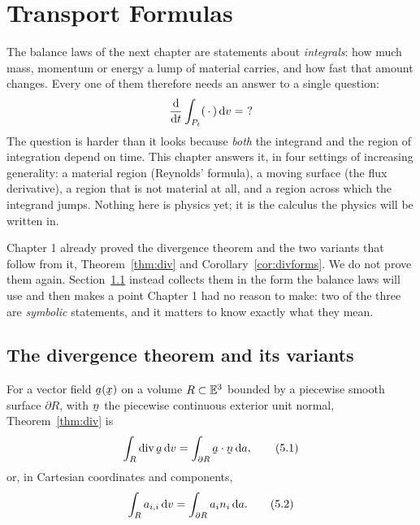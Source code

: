\chapter{Transport Formulas}

The balance laws of the next chapter are statements about \emph{integrals}:
how much mass, momentum or energy a lump of material carries, and how fast
that amount changes. Every one of them therefore needs an answer to a
single question:
\[
   \frac{\dl}{\dl t}\int_{P_{t}}(\,\cdot\,)\,\dl v=\ ?
\]
The question is harder than it looks because \emph{both} the integrand and
the region of integration depend on time. This chapter answers it, in four
settings of increasing generality: a material region (Reynolds' formula),
a moving surface (the flux derivative), a region that is not material at
all, and a region across which the integrand jumps. Nothing here is
physics yet; it is the calculus the physics will be written in.

Chapter 1 already proved the divergence theorem and the two variants that
follow from it, Theorem~\ref{thm:div} and Corollary~\ref{cor:divforms}. We
do not prove them again. Section~\ref{sec:divvar} instead collects them in
the form the balance laws will use and then makes a point Chapter 1 had no
reason to make: two of the three are \emph{symbolic} statements, and it
matters to know exactly what they mean.

\section{The divergence theorem and its variants}\label{sec:divvar}

For a vector field $\ba(\bx)$ on a volume $R\subset\mathbb{E}^{3}$ bounded by a
piecewise smooth surface $\partial R$, with $\bn$ the piecewise continuous
exterior unit normal, Theorem~\ref{thm:div} is
\begin{equation}
   \int_{R}\dvg\ba\,\dl v=\int_{\partial R}\ip\ba\bn\,\dl a ,
   \tag{5.1}\label{eq:5.1}
\end{equation}
or, in Cartesian coordinates and components,
\begin{equation}
   \int_{R}a_{i,i}\,\mathrm{d} v=\int_{\partial R}a_{i}n_{i}\,\mathrm{d} a .
   \tag{5.2}\label{eq:5.2}
\end{equation}

